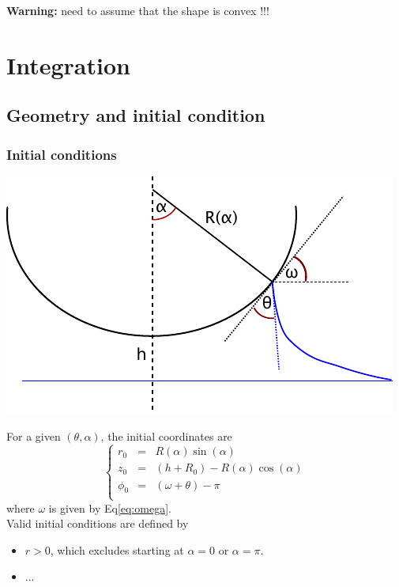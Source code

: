 \documentclass[aps,onecolumn]{revtex4}
\begin{document}
\textbf{Warning:} need to assume that the shape is convex  !!!

\section{Integration}

\subsection{Geometry and initial condition}

\subsubsection{Initial conditions}

\begin{center}
\includegraphics{geometry.pdf}
\end{center}

For a given $(\theta,\alpha)$, the initial coordinates are
\begin{equation}
\left\lbrace
\begin{array}{rcl}
	r_0    & = & R(\alpha) \sin(\alpha)\\
	z_0    & = & (h + R_0) - R(\alpha) \cos(\alpha)\\
	\phi_0 & = & \left(\omega + \theta\right) - \pi\\
\end{array}
\right. 
\end{equation}
where $\omega$ is given by Eq\eqref{eq:omega}.\\

Valid initial conditions are defined by
\begin{itemize}
\item $r>0$, which excludes starting at $\alpha=0$ or $\alpha=\pi$.
\item ...
\end{itemize}
\end{document}
